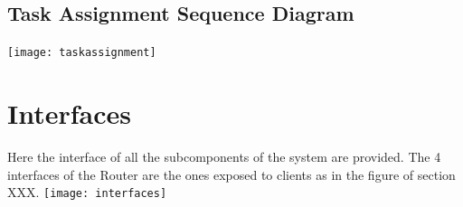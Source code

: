 \subsection{Task Assignment Sequence Diagram}
\texttt{[image: taskassignment]}
\newpage
\section{Interfaces}
Here the interface of all the subcomponents of the system are provided. The 4 interfaces of the Router are the ones exposed to clients as in the figure of section XXX.
\texttt{[image: interfaces]}

